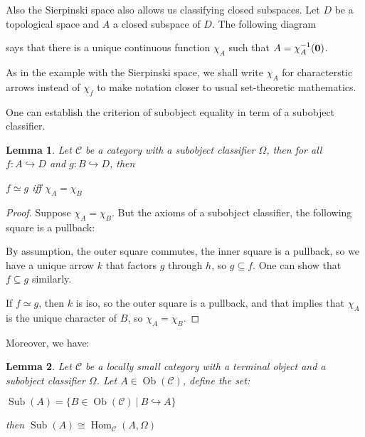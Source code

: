 \documentclass[a4paper]{article}
\theoremstyle{defin}
\theoremstyle{theorem}
\theoremstyle{claim}
\theoremstyle{prop}
\theoremstyle{lemma}
\newtheorem{lemma}{Lemma}
\theoremstyle{fact}
\theoremstyle{ex}
\theoremstyle{col}
\begin{document}
Also the Sierpinski space also allows us classifying closed subspaces. Let $D$ be a topological space and $A$ a closed subspace of $D$. The following diagram

says that there is a unique continuous function $\chi_A$ such that $A = \chi_A^{-1}({\bf 0})$.

As in the example with the Sierpinski space, we shall write $\chi_A$ for characterstic arrows instead of $\chi_f$ to make notation closer to usual set-theoretic mathematics.

One can establish the criterion of subobject equality in term of a subobject classifier.

\begin{lemma}

Let $\mathcal{C}$ be a category with a subobject classifier $\Omega$, then for all $f : A \hookrightarrow D$ and $g : B \hookrightarrow D$, then

\begin{center}
$f \simeq g$ iff $\chi_A = \chi_B$
\end{center}

\end{lemma}

\begin{proof}
Suppose $\chi_A = \chi_B$. But the axioms of a subobject classifier, the following square is a pullback:

\centerline{
}

By assumption, the outer square commutes, the inner square is a pullback, so we have a unique arrow $k$ that factors $g$ through $h$, so $g \subseteq f$. One can show that $f \subseteq g$ similarly.

If $f \simeq g$, then $k$ is iso, so the outer square is a pullback, and that implies that $\chi_A$ is the unique character of $B$, so $\chi_A = \chi_B$.
\end{proof}

Moreover, we have:
\begin{lemma}
Let $\mathcal{C}$ be a locally small category with a terminal object and a subobject classifier $\Omega$. Let $A \in \operatorname{Ob}(\mathcal{C})$, define the set:

\begin{center}
$\operatorname{Sub}(A) = \{ B \in \operatorname{Ob}(\mathcal{C}) \: | \: B \hookrightarrow A \}$
\end{center}

then $\operatorname{Sub}(A) \cong \operatorname{Hom}_{\mathcal{C}}(A, \Omega)$
\end{lemma}
\end{document}
